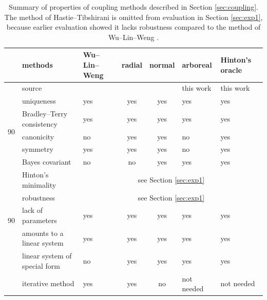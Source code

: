 \documentclass[pdflatex, sn-basic]{sn-jnl}%
\theoremstyle{thmstyleone}%
\theoremstyle{thmstyletwo}%
\theoremstyle{thmstylethree}%
\begin{document}
\begin{table}[!ht]
	\begin{tabular}{cm{2.5cm}|m{1.5cm}ccm{1.5cm}|m{1.5cm}}
		\hline 
		&methods %
			& Wu--Lin--Weng & radial & normal & arboreal & Hinton's oracle \\
		\hline 
		&source %
			& \cite{wu2004probability} & \cite{vsuch2015new} & \cite{vsuch2016bayes} & this work & this work \\
		\multirow{5}{*}{\begin{turn}{90}\makecell{exact}\end{turn}}
		&uniqueness %
			& yes & yes & yes & yes & yes \\
		&Bradley--Terry consistency %
			& yes & yes & yes & yes & yes \\
		&canonicity %
			& no & yes & yes & no & yes \\
		&symmetry %
			& yes & yes & yes & no & yes \\
		& Bayes covariant %
			& no & no & yes & yes & yes \\
		\hline
		\multirow{5}{*}{\begin{turn}{90}\makecell{non-exact}\end{turn}}
		&Hinton's minimality %
			& \multicolumn{5}{c}{see Section \ref{sec:exp1}} \\
		&robustness %
			& \multicolumn{5}{c}{see Section \ref{sec:exp1}} \\
		&lack of parameters %
			& yes & yes & yes & yes & yes \\
		& amounts to a linear system %
			& yes & yes & yes & yes & yes\\
		& linear system of special form %
			& no & yes & yes & yes & yes \\
		& iterative method %
			& yes & yes & no & not needed & not needed\\
		\hline
	\end{tabular}
	\caption{Summary of properties of coupling methods described in Section \ref{sec:coupling}. The method of Hastie--Tibshirani is omitted from evaluation in Section \ref{sec:exp1}, because earlier evaluation showed it lacks robustness compared to the method of Wu--Lin--Weng \cite{wu2004probability}.}
	\label{tab:summaryCoupling}
\end{table}
\end{document}
